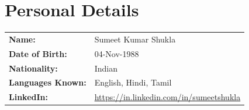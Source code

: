 \documentclass[10pt,a4paper]{article}
\begin{document}
\section{Personal Details}
\begin{tabular}{@{}ll}
    \textbf{Name:} & Sumeet Kumar Shukla \\
    \textbf{Date of Birth:} & 04-Nov-1988 \\
    \textbf{Nationality:} & Indian \\
    \textbf{Languages Known:} & English, Hindi, Tamil \\
    \textbf{LinkedIn:} & \href{https://in.linkedin.com/in/sumeetshukla}{https://in.linkedin.com/in/sumeetshukla}
\end{tabular}
\end{document}
